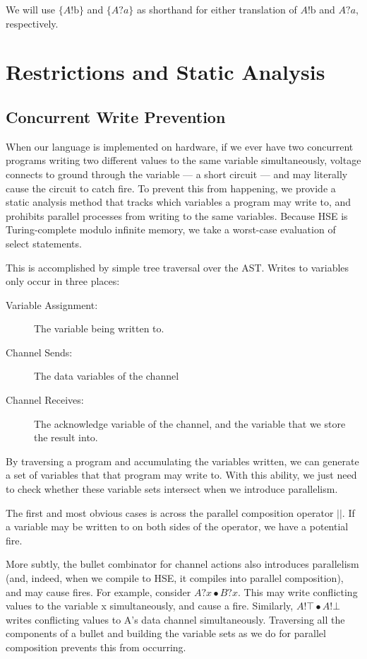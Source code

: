 \documentclass[times, 10pt]{article}
\begin{document}
We will use $\{A!\mathrm{b}\}$ and $\{A?a\}$ as shorthand for either translation
of $A!\mathrm{b}$ and $A?a$, respectively.

\section{Restrictions and Static Analysis}

\subsection{Concurrent Write Prevention}

When our language is implemented on hardware, if we ever have two concurrent
programs writing two different values to the same variable simultaneously,
voltage connects to ground through the variable --- a short circuit --- and may
literally cause the circuit to catch fire.  To prevent this from happening, we
provide a static analysis method that tracks which variables a program may write
to, and prohibits parallel processes from writing to the same variables.
Because HSE is Turing-complete modulo infinite memory, we take a worst-case
evaluation of select statements.

This is accomplished by simple tree traversal over the AST.  Writes to variables
only occur in three places:

\begin{description}
\item[Variable Assignment:] The variable being written to.
\item[Channel Sends:] The data variables of the channel
\item[Channel Receives:] The acknowledge variable of the channel, and the
variable that we store the result into.
\end{description}

By traversing a program and accumulating the variables written, we can generate
a set of variables that that program may write to.  With this ability, we just
need to check whether these variable sets intersect when we introduce
parallelism.

The first and most obvious cases is across the parallel composition operator
$||$.  If a variable may be written to on both sides of the operator, we have a
potential fire.

More subtly, the bullet combinator for channel actions also introduces
parallelism (and, indeed, when we compile to HSE, it compiles into parallel
composition), and may cause fires.  For example, consider $A?x \bullet B?x$.
This may write conflicting values to the variable x simultaneously, and cause a
fire.  Similarly, $A!\top \bullet A!\bot$ writes conflicting values to A's data
channel simultaneously.  Traversing all the components of a bullet and building
the variable sets as we do for parallel composition prevents this from occurring.
\end{document}
